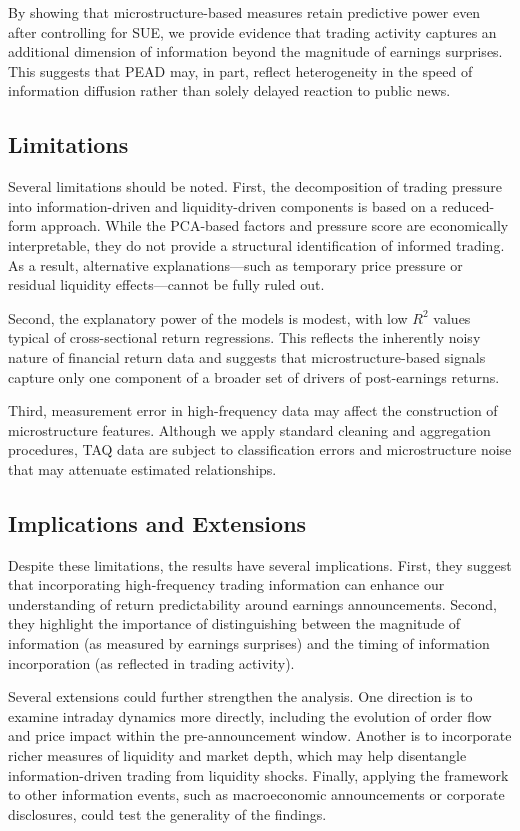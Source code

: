 By showing that microstructure-based measures retain predictive power even after controlling for SUE, we provide evidence that trading activity captures an additional dimension of information beyond the magnitude of earnings surprises. This suggests that PEAD may, in part, reflect heterogeneity in the speed of information diffusion rather than solely delayed reaction to public news.

\subsection{Limitations}

Several limitations should be noted. First, the decomposition of trading pressure into information-driven and liquidity-driven components is based on a reduced-form approach. While the PCA-based factors and pressure score are economically interpretable, they do not provide a structural identification of informed trading. As a result, alternative explanations—such as temporary price pressure or residual liquidity effects—cannot be fully ruled out.

Second, the explanatory power of the models is modest, with low $R^2$ values typical of cross-sectional return regressions. This reflects the inherently noisy nature of financial return data and suggests that microstructure-based signals capture only one component of a broader set of drivers of post-earnings returns.

Third, measurement error in high-frequency data may affect the construction of microstructure features. Although we apply standard cleaning and aggregation procedures, TAQ data are subject to classification errors and microstructure noise that may attenuate estimated relationships.

\subsection{Implications and Extensions}

Despite these limitations, the results have several implications. First, they suggest that incorporating high-frequency trading information can enhance our understanding of return predictability around earnings announcements. Second, they highlight the importance of distinguishing between the magnitude of information (as measured by earnings surprises) and the timing of information incorporation (as reflected in trading activity).

Several extensions could further strengthen the analysis. One direction is to examine intraday dynamics more directly, including the evolution of order flow and price impact within the pre-announcement window. Another is to incorporate richer measures of liquidity and market depth, which may help disentangle information-driven trading from liquidity shocks. Finally, applying the framework to other information events, such as macroeconomic announcements or corporate disclosures, could test the generality of the findings.

